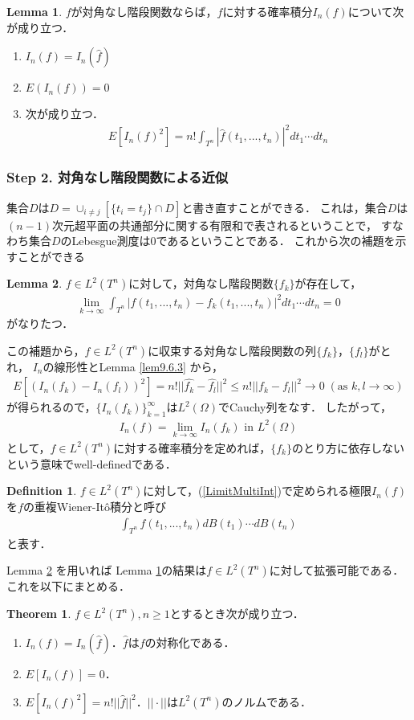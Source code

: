 \documentclass[a4paper,10pt]{jsarticle}
\theoremstyle{definition}
\newtheorem{theorem}{Theorem}
\newtheorem{definition}{Definition}
\newtheorem{lemma}{Lemma}
\newcommand{\eq}[1]{\begin{align}#1\end{align}}
\newcommand{\enums}[1]{\begin{enumerate}#1\end{enumerate}}
\begin{document}
\begin{lemma}\label{lem9.6.2and9.6.3}%
$f$が対角なし階段関数ならば，$f$に対する確率積分$I_n(f)$について次が成り立つ．
\enums{
	\item $I_n(f)=I_n(\hat{f})$
	\item $E\left(I_n(f)\right)=0$
	\item 次が成り立つ．
		\eq{E\left[I_n(f)^2\right]=n!\int_{T^n}|\hat{f}(t_1,...,t_n)|^2dt_1\cdots dt_n}
}
\end{lemma}

\subsubsection*{Step 2. 対角なし階段関数による近似}
集合$D$は$D=\cup_{i\neq j}[\{t_i=t_j\}\cap D]$と書き直すことができる．
これは，集合$D$は$(n-1)$次元超平面の共通部分に関する有限和で表されるということで，
すなわち集合$D$のLebesgue測度は$0$であるということである．
これから次の補題を示すことができる
\begin{lemma}\label{lem9.6.4}%
$f\in L^2(T^n)$に対して，対角なし階段関数$\{f_k\}$が存在して，
\eq{\lim_{k\rightarrow\infty}\int_{T^n}\left|f(t_1,...,t_n)-f_k(t_1,...,t_n)\right|^2dt_1\cdots dt_n=0}
がなりたつ．
\end{lemma}
この補題から，$f\in L^2(T^n)$に収束する対角なし階段関数の列$\{f_k\}$，$\{f_l\}$がとれ，
$I_n$の線形性とLemma \ref{lem9.6.3} から，
\eq{E\left[\left(I_n(f_k)-I_n(f_l)\right)^2\right]=n!||\hat{f_k}-\hat{f_l}||^2\le n!||f_k-f_l||^2\rightarrow0\;(\text{as }k,l\rightarrow\infty)}
が得られるので，$\{I_n(f_k)\}_{k=1}^\infty$は$L^2(\Omega)$でCauchy列をなす．
したがって，
\eq{I_n(f)=\lim_{k\rightarrow\infty}I_n(f_k)\text{ in }L^2(\Omega)\label{LimitMultiInt}}
として，$f\in L^2(T^n)$に対する確率積分を定めれば，$\{f_k\}$のとり方に依存しないという意味でwell-definedである．
\begin{definition}\label{def9.6.5}
$f\in L^2(T^n)$に対して，(\ref{LimitMultiInt})で定められる極限$I_n(f)$を$f$の重複Wiener-It\^o積分と呼び
\eq{\int_{T^n}f(t_1,...,t_n)dB(t_1)\cdots dB(t_n)}
と表す．
\end{definition}
Lemma \ref{lem9.6.4} を用いれば Lemma \ref{lem9.6.2and9.6.3}の結果は$f\in L^2(T^n)$に対して拡張可能である．
これを以下にまとめる．
\begin{theorem}\label{9.6.6}%
$f\in L^2(T^n),n\ge1$とするとき次が成り立つ．
\enums{
	\item $I_n(f)=I_n(\hat{f})$．$\hat{f}$は$f$の対称化である．
	\item $E\left[I_n(f)\right]=0$．
	\item $E\left[I_n(f)^2\right]=n!||\hat{f}||^2$．$||\cdot||$は$L^2(T^n)$のノルムである．}
\end{theorem}
\end{document}
